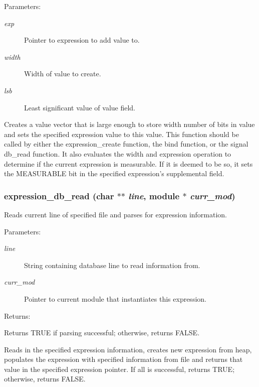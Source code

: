 \begin{Desc}
\item[Parameters: ]\par
\begin{description}
\item[{\em 
exp}]Pointer to expression to add value to. \item[{\em 
width}]Width of value to create. \item[{\em 
lsb}]Least significant value of value field.\end{description}
\end{Desc}
Creates a value vector that is large enough to store width number of bits in value and sets the specified expression value to this value. This function should be called by either the expression\_\-create function, the bind function, or the signal db\_\-read function. It also evaluates the width and expression operation to determine if the current expression is measurable. If it is deemed to be so, it sets the MEASURABLE bit in the specified expression's supplemental field. 
\subsubsection{ expression\_\-db\_\-read (char $\ast$$\ast$ {\em line}, {\bf module} $\ast$ {\em curr\_\-mod})}\label{expr_8c_a11}


Reads current line of specified file and parses for expression information.

\begin{Desc}
\item[Parameters: ]\par
\begin{description}
\item[{\em 
line}]String containing database line to read information from. \item[{\em 
curr\_\-mod}]Pointer to current module that instantiates this expression.\end{description}
\end{Desc}
\begin{Desc}
\item[Returns: ]\par
Returns TRUE if parsing successful; otherwise, returns FALSE.\end{Desc}
Reads in the specified expression information, creates new expression from heap, populates the expression with specified information from file and  returns that value in the specified expression pointer. If all is  successful, returns TRUE; otherwise, returns FALSE. 

